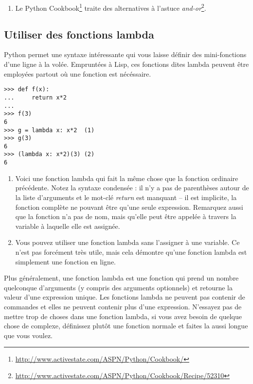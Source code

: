 \begin{enumerate}
    \item Le Python Cookbook\footnote{\url{http://www.activestate.com/ASPN/Python/Cookbook/}} traite des alternatives à l’astuce \emph{and-or}\footnote{\url{http://www.activestate.com/ASPN/Python/Cookbook/Recipe/52310}}.
\end{enumerate}

\subsection{Utiliser des fonctions lambda}

Python permet une syntaxe intéressante qui vous laisse définir des mini-fonctions d’une ligne à la volée. Empruntées à Lisp, ces fonctions dites lambda peuvent être employées partout où une fonction est nécéssaire.

\begin{example}
\begin{lstlisting}
>>> def f(x):
...     return x*2
...
>>> f(3)
6
>>> g = lambda x: x*2  (1)
>>> g(3)
6
>>> (lambda x: x*2)(3) (2)
6
\end{lstlisting}
\end{example}

\begin{enumerate}
    \item{Voici une fonction lambda qui fait la même chose que la fonction ordinaire précédente. Notez la syntaxe condensée : il n’y a pas de parenthèses autour de la liste d’arguments et le mot-clé \emph{return }est manquant -- il est implicite, la fonction complète ne pouvant être qu’une seule expression. Remarquez aussi que la fonction n’a pas de nom, mais qu’elle peut être appelée à travers la variable à laquelle elle est assignée.}
    \item{Vous pouvez utiliser une fonction lambda sans l’assigner à une variable. Ce n’est pas forcément très utile, mais cela démontre qu’une fonction lambda est simplement une fonction en ligne.}
\end{enumerate}

Plus généralement, une fonction lambda est une fonction qui prend un nombre quelconque d’arguments (y compris des arguments optionnels) et retourne la valeur d’une expression unique. Les fonctions lambda ne peuvent pas contenir de commandes et elles ne peuvent contenir plus d’une expression. N’essayez pas de mettre trop de choses dans une fonction lambda, si vous avez besoin de quelque chose de complexe, définissez plutôt une fonction normale et faites la aussi longue que vous voulez.

